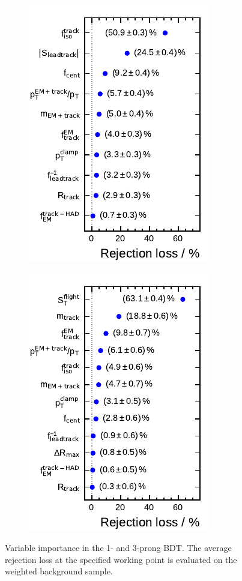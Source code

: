\begin{figure}[htb]
  \centering
  \begin{subfigure}[t]{0.48\textwidth}
    \centering
    \includegraphics{./figures/bdt_perf/var_importance/1p_iter1.pdf}
  \end{subfigure}\hfill
  \begin{subfigure}[t]{0.48\textwidth}
    \centering
    \includegraphics{./figures/bdt_perf/var_importance/3p_iter1.pdf}
  \end{subfigure}
  \caption{Variable importance in the 1- and 3-prong BDT. The average rejection
    loss at the specified working point is evaluated on the weighted background
    sample.}
  \label{fig:variable_importance}
\end{figure}

